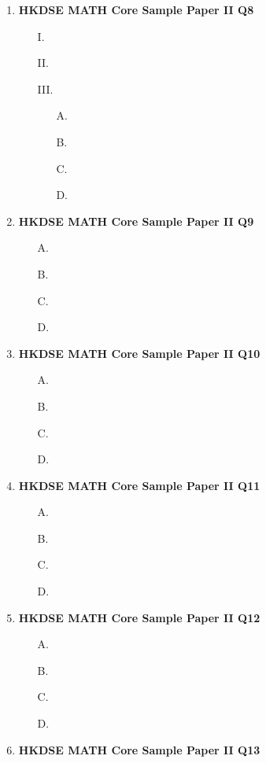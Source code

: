 \documentclass[12pt]{article}
\begin{document}
\begin{enumerate}
	\item \textbf{HKDSE MATH Core Sample Paper II Q8}\\
	\begin{enumerate}
		\item[I.]
		\item[II.]
		\item[III.]
		\begin{enumerate}
			\item[A.]
			\item[B.]
			\item[C.]
			\item[D.]
		\end{enumerate}
	\end{enumerate}
	\item \textbf{HKDSE MATH Core Sample Paper II Q9}\\
	\begin{enumerate}
		\item[A.]
		\item[B.]
		\item[C.]
		\item[D.]
	\end{enumerate}
	\item \textbf{HKDSE MATH Core Sample Paper II Q10}\\
	\begin{enumerate}
		\item[A.]
		\item[B.]
		\item[C.]
		\item[D.]
	\end{enumerate}
	\item \textbf{HKDSE MATH Core Sample Paper II Q11}\\
	\begin{enumerate}
		\item[A.]
		\item[B.]
		\item[C.]
		\item[D.]
	\end{enumerate}
	\item \textbf{HKDSE MATH Core Sample Paper II Q12}\\
	\begin{enumerate}
		\item[A.]
		\item[B.]
		\item[C.]
		\item[D.]
	\end{enumerate}
	\item \textbf{HKDSE MATH Core Sample Paper II Q13}\\

\end{enumerate}
\end{document}
